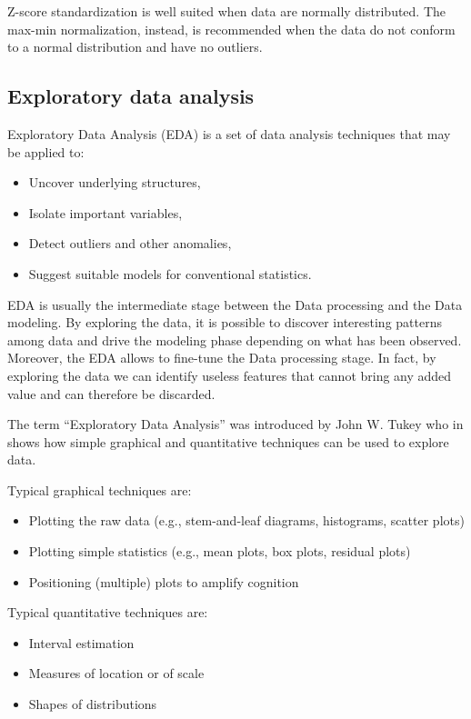 Z-score standardization is well suited when data are normally distributed.
The max-min normalization, instead, is recommended when the data do not conform to a normal distribution and have no outliers. 


\subsection{Exploratory data analysis} \label{Exploratory Data Analysis}

Exploratory Data Analysis (EDA) is a set of data analysis techniques that may be applied to:

\begin{itemize}
    \item Uncover underlying structures,
    \item Isolate important variables,
    \item Detect outliers and other anomalies,
    \item Suggest suitable models for conventional statistics.
\end{itemize}

EDA is usually the intermediate stage between the Data processing and the Data modeling. By exploring the data, it is possible to discover interesting patterns among data and drive the modeling phase depending on what has been observed. Moreover, the EDA allows to fine-tune the Data processing stage. In fact, by exploring the data we can identify useless features that cannot bring any added value and can therefore be discarded.   

The term “Exploratory Data Analysis” was introduced by John W. Tukey who in \citep{tukey1977exploratory} shows how simple graphical and quantitative techniques can be used to explore data.

Typical graphical techniques are:

\begin{itemize}
    \item Plotting the raw data (e.g., stem-and-leaf diagrams, histograms, scatter plots)
    \item Plotting simple statistics (e.g., mean plots, box plots, residual plots)
    \item Positioning (multiple) plots to amplify cognition
\end{itemize}

Typical quantitative techniques are:

\begin{itemize}
    \item Interval estimation
    \item Measures of location or of scale
    \item Shapes of distributions
\end{itemize}

